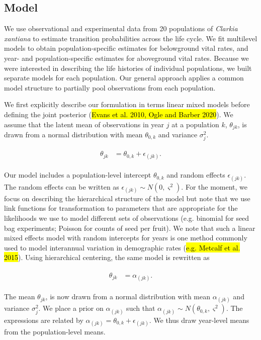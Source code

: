 \documentclass[12pt, oneside, titlepage]{article}   	%
\begin{document}
\subsection{Model}

We use observational and experimental data from 20 populations of \textit{Clarkia xantiana} to estimate transition probabilities across the life cycle. We fit multilevel models to obtain population-specific estimates for belowground vital rates, and year- and population-specific estimates for aboveground vital rates. Because we were interested in describing the life histories of individual populations, we built separate models for each population. Our general approach applies a common model structure to partially pool observations from each population. 

We first explicitly describe our formulation in terms linear mixed models before defining the joint posterior (\hl{Evans et al. 2010, Ogle and Barber 2020}). We assume that the latent mean of observations in year $j$ at a population $k$, $\theta_{jk}$, is drawn from a normal distribution with mean $\theta_{0,k}$ and variance $\sigma^2_j$.

\begin{align}
  \begin{split}
  \theta_{jk} &  = \theta_{0,k} +\epsilon_{(jk)}.
  \end{split}
\end{align}

Our model includes a population-level intercept $\theta_{0,k}$ and random effects $\epsilon_{(jk)}$. The random effects can be written as  $\epsilon_{(jk)}\sim N(0, \varsigma^2)$. For the moment, we focus on describing the hierarchical structure of the model but note that we use link functions for transformation to parameters that are appropriate for the likelihoods we use to model different sets of observations (e.g. binomial for seed bag experiments; Poisson for counts of seed per fruit). We note that such a linear mixed effects model with random intercepts for years is one method commonly used to model interannual variation in demographic rates (\hl{e.g. Metcalf et al. 2015}). Using hierarchical centering, the same model is rewritten as 

\begin{align}
  \begin{split}
  \theta_{jk} &  = \alpha_{(jk)}.
  \end{split}
\end{align}

The mean $\theta_{jk}$, is now drawn from a normal distribution with mean $\alpha_{(jk)}$ and variance $\sigma^2_j$. We place a prior on $\alpha_{(jk)}$ such that $\alpha_{(jk)}\sim N(\theta_{0,k}, \varsigma^2)$. The expressions are related by $\alpha_{(jk)}=\theta_{0,k}+\epsilon_{(jk)}$. We thus draw year-level means from the population-level means. 
\end{document}
